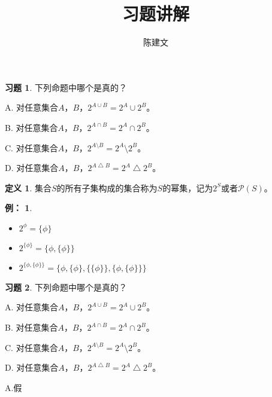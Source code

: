 \documentclass{beamer}
\begin{document}
\begin{CJK*}{UTF8}{gbsn}


  
\theoremstyle{definition}
\newtheorem{Def}{定义}
\theoremstyle{example}
\newtheorem*{Ex}{例：}
\newtheorem*{Exercise}{习题}

\date{}
\author{陈建文}
\title{习题讲解}
\begin{frame}
  \titlepage
\end{frame}

\begin{frame}
\begin{Exercise}
  下列命题中哪个是真的？

A. 对任意集合$A$，$B$，$2^{A\cup B} = 2^A \cup 2^B$。

B. 对任意集合$A$，$B$，$2^{A\cap B} = 2^A \cap 2^B$。

C. 对任意集合$A$，$B$，$2^{A\setminus B} = 2^A \setminus 2^B$。

D. 对任意集合$A$，$B$，$2^{A\bigtriangleup B} = 2^A \bigtriangleup 2^B$。

\end{Exercise}
\pause
  \begin{Def}
  集合$S$的所有子集构成的集合称为$S$的幂集，记为$2^S$或者$\mathcal{P}(S)$。
\end{Def}
  \begin{Ex}
    \begin{itemize}
    \item $2^\phi=\{\phi\}$
    \item $2^{\{\phi\}}=\{\phi,\{\phi\}\}$
    \item $2^{\{\phi,\{\phi\}\}}=\{\phi,\{\phi\},\{\{\phi\}\},\{\phi,\{\phi\}\}\}$
    \end{itemize}
    \end{Ex}
  \end{frame}

  
\begin{frame}
\begin{Exercise}
  下列命题中哪个是真的？

A. 对任意集合$A$，$B$，$2^{A\cup B} = 2^A \cup 2^B$。

B. 对任意集合$A$，$B$，$2^{A\cap B} = 2^A \cap 2^B$。

C. 对任意集合$A$，$B$，$2^{A\setminus B} = 2^A \setminus 2^B$。

D. 对任意集合$A$，$B$，$2^{A\bigtriangleup B} = 2^A \bigtriangleup 2^B$。

\end{Exercise}
\pause
A.假
\begin{center}
\end{center}
\end{frame}


\end{CJK*}
\end{document}
